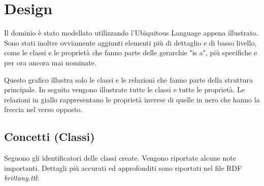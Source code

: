 \section{Design}


\noindent Il dominio è stato modellato utilizzando l'Ubiquitous Language appena illustrato. Sono stati inoltre ovviamente aggiunti elementi più di dettaglio e di basso livello, come le classi e le proprietà che fanno parte delle gerarchie "is a", più specifiche e per ora ancora mai nominate.

\noindent Questo grafico illustra solo le classi e le relazioni che fanno parte della struttura principale. In seguito vengono illustrate tutte le classi e tutte le proprietà. Le relazioni in giallo rappresentano le proprietà inverse di quelle in nero che hanno la freccia nel verso opposto.

\subsection{Concetti (Classi)}
Seguono gli identificatori delle classi create. Vengono riportate alcune note importanti. Dettagli più accurati ed approfonditi sono riportati nel file RDF \textit{brittany.ttl}:

